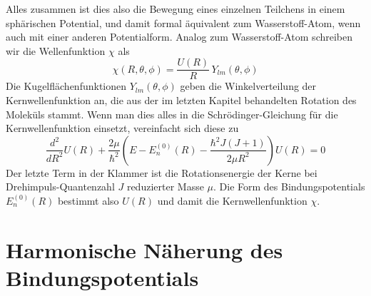 Alles zusammen ist dies also die Bewegung eines einzelnen Teilchens in einem sphärischen Potential, und damit formal äquivalent zum Wasserstoff-Atom, wenn auch mit einer anderen Potentialform. Analog zum Wasserstoff-Atom schreiben wir die Wellenfunktion $\chi$ als
\begin{equation}
 \chi (R, \theta, \phi) = \frac{U(R)}{R} \, Y_{l m} (\theta, \phi)
\end{equation}
Die Kugelflächenfunktionen $ Y_{l m} (\theta, \phi)$ geben die Winkelverteilung der Kernwellenfunktion an, die aus der im letzten Kapitel behandelten Rotation des Moleküls stammt. Wenn man dies alles in die Schrödinger-Gleichung für die Kernwellenfunktion einsetzt, vereinfacht sich diese zu
\begin{equation}
 \frac{d^2}{d R^2} U(R) + \frac{2 \mu }{\hbar^2} \left( E - E_n^{(0)}(R) - \frac{\hbar^2 J (J+1)}{2 \mu R^2} \right) U(R) = 0
 \label{eq:vib_zweiatom_U}
\end{equation}
Der letzte Term in der Klammer ist die Rotationsenergie der Kerne bei  Drehimpuls-Quantenzahl $J$ reduzierter Masse $\mu$. Die Form des Bindungspotentials $E_n^{(0)}(R)$ bestimmt also $U(R)$ und damit die Kernwellenfunktion $\chi$.


\section{Harmonische Näherung des Bindungspotentials}

